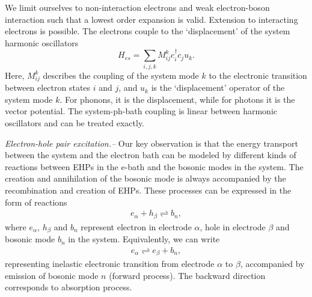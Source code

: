 \documentclass[aps
,twocolumn
,floatfix,footinbib,prl,longbibliography
]{revtex4-1}
\begin{document}
We limit ourselves to non-interaction electrons and weak electron-boson interaction such that a lowest order expansion is valid\cite{paulsson05modeling}. Extension to interacting electrons is possible\cite{dou_born-oppenheimer_2017}. The electrons couple to the `displacement' of the system harmonic oscillators
\begin{equation}
H_{es} = \sum_{i,j,k} M^{k}_{ij}c^\dagger_i c_j u_k.
\label{eq:eboson}
\end{equation}
Here, $M^k_{ij}$ describes the coupling of the system mode $k$ to the electronic transition between electron states $i$ and $j$, and $u_k$ is the `displacement' operator of the system mode $k$. For phonons, it is the displacement, while for photons it is the vector potential. The system-ph-bath coupling is linear between harmonic oscillators and can be treated exactly.





\emph{ Electron-hole pair excitation.--}
Our key observation is that the energy transport between the system and the electron bath can be modeled by different kinds of reactions between EHPs in the e-bath and the bosonic modes in the system. The creation and annihilation of the bosonic mode is always accompanied by the recombination and creation of EHPs. These processes can be expressed in the form of reactions
\begin{align}
e_\alpha + h_\beta \rightleftharpoons b_n,
\label{eq:reaction}
\end{align}
where $e_\alpha$, $h_\beta$ and $b_n$ represent electron in electrode $\alpha$, hole in electrode $\beta$ and bosonic mode $b_n$ in the system. Equivalently, we can write 
\begin{align}
e_\alpha \rightleftharpoons e_\beta + b_n,
\label{eq:reaction2}
\end{align}
representing inelastic electronic transition from electrode $\alpha$ to $\beta$, accompanied by emission of bosonic mode $n$ (forward process). The backward direction corresponds to absorption process.
\end{document}

